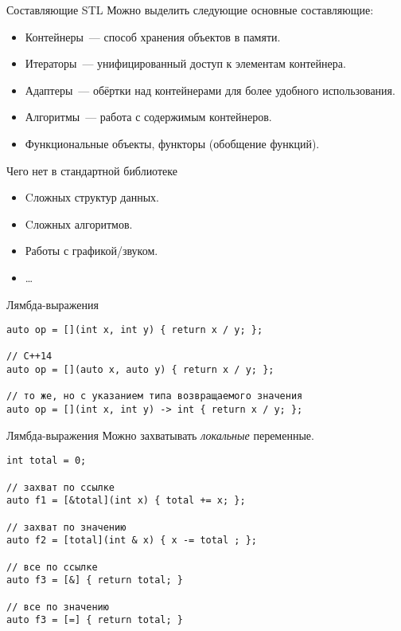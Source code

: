 \documentclass{beamer}
\begin{document}
\begin{frame}{Составляющие STL}
    Можно выделить следующие основные составляющие:
    \begin{itemize}
        \item Контейнеры~--- способ хранения объектов в памяти.
        \item Итераторы~--- унифицированный доступ к элементам контейнера.
        \item Адаптеры~--- обёртки над контейнерами для более удобного использования.
        \item Алгоритмы~--- работа с содержимым контейнеров.
        \item Функциональные объекты, функторы (обобщение функций).
    \end{itemize}
\end{frame}

\begin{frame}{Чего нет в стандартной библиотеке}{}
    \begin{itemize}
        \item Cложных структур данных.
        \item Cложных алгоритмов.
        \item Работы с графикой/звуком.
        \item \dots
    \end{itemize}
\end{frame}

\begin{frame}[fragile]{Лямбда-выражения}
    \begin{lstlisting}
auto op = [](int x, int y) { return x / y; };

// С++14
auto op = [](auto x, auto y) { return x / y; };

// то же, но с указанием типа возвращаемого значения
auto op = [](int x, int y) -> int { return x / y; };
    \end{lstlisting}
\end{frame}

\begin{frame}[fragile]{Лямбда-выражения}    
    Можно захватывать \emph{локальные} переменные.
    \begin{lstlisting}
int total = 0;

// захват по ссылке
auto f1 = [&total](int x) { total += x; };

// захват по значению
auto f2 = [total](int & x) { x -= total ; };

// все по ссылке
auto f3 = [&] { return total; }

// все по значению
auto f3 = [=] { return total; }
    \end{lstlisting}
\end{frame}
\end{document}
